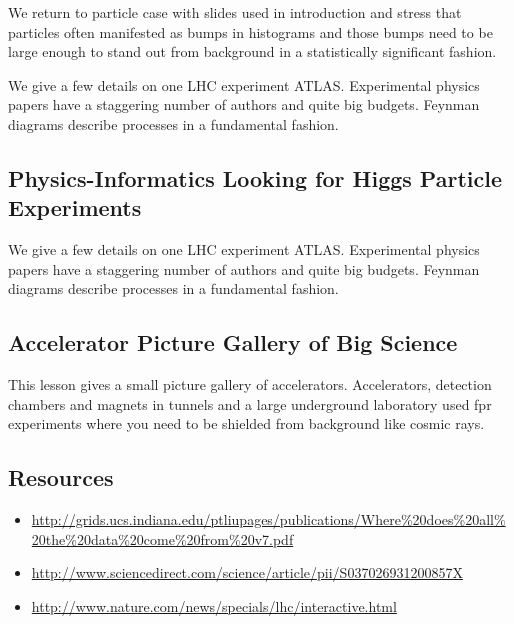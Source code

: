 We return to particle case with slides used in introduction and stress
that particles often manifested as bumps in histograms and those bumps
need to be large enough to stand out from background in a statistically
significant fashion.


We give a few details on one LHC experiment ATLAS. Experimental physics
papers have a staggering number of authors and quite big budgets.
Feynman diagrams describe processes in a fundamental fashion.


\subsection{Physics-Informatics Looking for Higgs Particle
Experiments}\label{physics-informatics-looking-for-higgs-particle-experiments}

We give a few details on one LHC experiment ATLAS. Experimental physics
papers have a staggering number of authors and quite big budgets.
Feynman diagrams describe processes in a fundamental fashion.


\subsection{Accelerator Picture Gallery of Big
Science}\label{accelerator-picture-gallery-of-big-science}

This lesson gives a small picture gallery of accelerators. Accelerators,
detection chambers and magnets in tunnels and a large underground
laboratory used fpr experiments where you need to be shielded from
background like cosmic rays.


\subsection{Resources}\label{resources}

\begin{itemize}

\item
  \url{http://grids.ucs.indiana.edu/ptliupages/publications/Where\%20does\%20all\%20the\%20data\%20come\%20from\%20v7.pdf}
\item
  \url{http://www.sciencedirect.com/science/article/pii/S037026931200857X}
\item
  \url{http://www.nature.com/news/specials/lhc/interactive.html}
\end{itemize}

